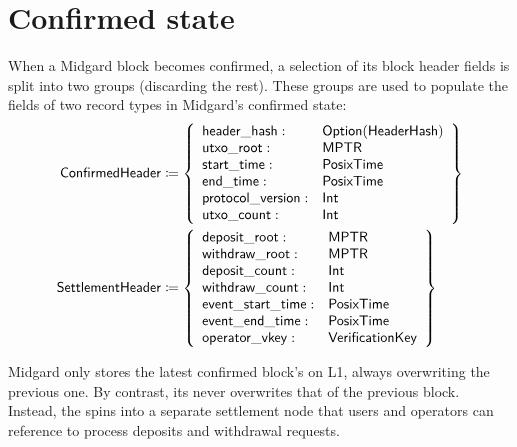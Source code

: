 \documentclass[../midgard.tex]{subfiles}
\begin{document}
\section{Confirmed state}
\label{h:confirmed-state}

\todo

When a Midgard block becomes confirmed, a selection of its block header fields is split into two groups (discarding the rest).
These groups are used to populate the fields of two record types in Midgard's confirmed state:
\begingroup
\allowdisplaybreaks
\begin{align*}
    \mathsf{ConfirmedHeader} &\coloneq \left\{
    \begin{array}{ll}
        \mathsf{header\_hash} : & \mathsf{Option(HeaderHash)} \\
        \mathsf{utxo\_root} : & \mathsf{MPTR} \\
        \mathsf{start\_time} : & \mathsf{PosixTime} \\
        \mathsf{end\_time} : & \mathsf{PosixTime} \\
        \mathsf{protocol\_version} : & \mathsf{Int} \\
        \mathsf{utxo\_count} : & \mathsf{Int}
    \end{array} \right\} \\
    \mathsf{SettlementHeader} &\coloneq \left\{
    \begin{array}{ll}
        \mathsf{deposit\_root} : & \mathsf{MPTR} \\
        \mathsf{withdraw\_root} : & \mathsf{MPTR} \\
        \mathsf{deposit\_count} : & \mathsf{Int} \\
        \mathsf{withdraw\_count} : & \mathsf{Int} \\
        \mathsf{event\_start\_time}: & \mathsf{PosixTime} \\
        \mathsf{event\_end\_time}: & \mathsf{PosixTime} \\
        \mathsf{operator\_vkey} : & \mathsf{VerificationKey}
    \end{array} \right\}
\end{align*}
\endgroup

Midgard only stores the latest confirmed block's  on L1, always overwriting the previous one.
By contrast, its  never overwrites that of the previous block.
Instead, the  spins into a separate settlement node that users and operators can reference to process deposits and withdrawal requests.
\end{document}
